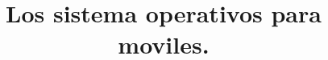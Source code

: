 \documentclass{bmcart}
\begin{document}
\begin{frontmatter}

\begin{fmbox}


\title{Los sistema operativos para moviles.}








\begin{artnotes}
\end{artnotes}

\end{fmbox}%



\end{frontmatter}
\end{document}
